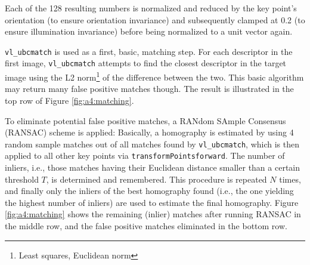 Each of the 128 resulting numbers is normalized and reduced by the key point's orientation (to ensure orientation invariance) and subsequently clamped at 0.2 (to ensure illumination invariance) before being normalized to a unit vector again.

%

\texttt{vl\_ubcmatch} is used as a first, basic, matching step. For each descriptor in the first image, \texttt{vl\_ubc\-match} attempts to find the closest descriptor in the target image using the L2 norm\footnote{Least squares, Euclidean norm} of the difference between the two. This basic algorithm may return many false positive matches though. The result is illustrated in the top row of Figure \ref{fig:a4:matching}.

To eliminate potential false positive matches, a RANdom SAmple Consensus (RANSAC) \cite{Fischler81} scheme is applied: Basically, a homography is estimated by using 4 random sample matches out of all matches found by \texttt{vl\_ubcmatch}, which is then applied to all other key points via \texttt{transformPointsforward}. The number of inliers, i.e.,  those matches having their Euclidean distance smaller than a certain threshold $T$, is determined and remembered.
This procedure is repeated $N$ times, and finally only the inliers of the best homography found (i.e., the one yielding the highest number of inliers) are used to estimate the final homography.
Figure \ref{fig:a4:matching} shows the remaining (inlier) matches after running RANSAC in the middle row, and the false positive matches eliminated in the bottom row.

